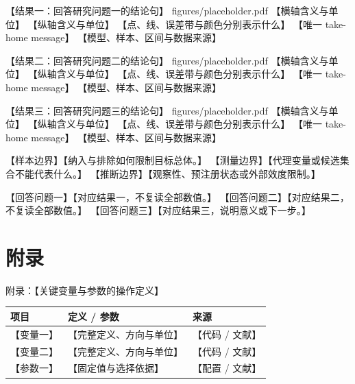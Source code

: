 \documentclass[aspectratio=169,11pt,fontset=fandol]{ctexbeamer}
\begin{document}
\fullfigureslide
  {【结果一：回答研究问题一的结论句】}
  {figures/placeholder.pdf}
  {【横轴含义与单位】}
  {【纵轴含义与单位】}
  {【点、线、误差带与颜色分别表示什么】}
  {【唯一 take-home message】}
  {【模型、样本、区间与数据来源】}

\fullfigureslide
  {【结果二：回答研究问题二的结论句】}
  {figures/placeholder.pdf}
  {【横轴含义与单位】}
  {【纵轴含义与单位】}
  {【点、线、误差带与颜色分别表示什么】}
  {【唯一 take-home message】}
  {【模型、样本、区间与数据来源】}

\fullfigureslide
  {【结果三：回答研究问题三的结论句】}
  {figures/placeholder.pdf}
  {【横轴含义与单位】}
  {【纵轴含义与单位】}
  {【点、线、误差带与颜色分别表示什么】}
  {【唯一 take-home message】}
  {【模型、样本、区间与数据来源】}

  {【样本边界】}{【纳入与排除如何限制目标总体。】}
  {【测量边界】}{【代理变量或候选集合不能代表什么。】}
  {【推断边界】}{【观察性、预注册状态或外部效度限制。】}

  {【回答问题一】}{【对应结果一，不复读全部数值。】}
  {【回答问题二】}{【对应结果二，不复读全部数值。】}
  {【回答问题三】}{【对应结果三，说明意义或下一步。】}


\appendix
\section{附录}


\begin{frame}{附录：【关键变量与参数的操作定义】}
  \normalsize\setlength{\tabcolsep}{3pt}
  \begin{tabular}{@{}p{3.2cm} p{6.0cm} p{4.0cm}@{}}
    \toprule
    项目 & 定义 / 参数 & 来源 \\
    \midrule
    【变量一】 & 【完整定义、方向与单位】 & 【代码 / 文献】 \\
    【变量二】 & 【完整定义、方向与单位】 & 【代码 / 文献】 \\
    【参数一】 & 【固定值与选择依据】 & 【配置 / 文献】 \\
    \bottomrule
  \end{tabular}
\end{frame}
\end{document}
